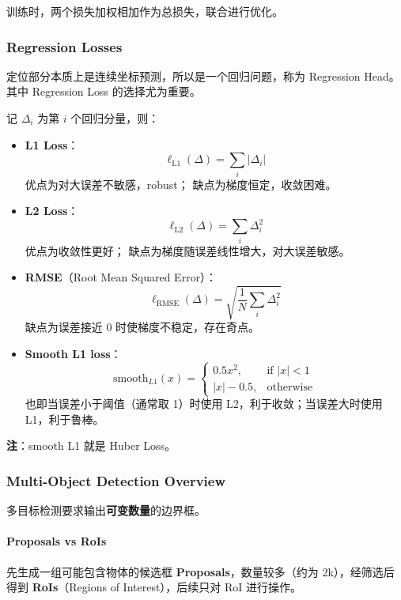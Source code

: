 训练时，两个损失加权相加作为总损失，联合进行优化。

\subsubsection{Regression Losses}\label{regression-losses}

定位部分本质上是连续坐标预测，所以是一个回归问题，称为 Regression
Head。其中 Regression Loss 的选择尤为重要。

记 \(\Delta_i\) 为第 \(i\) 个回归分量，则：

\begin{itemize}
\item
  \textbf{L1 Loss}： \[
    \ell_{\text{L1}}(\Delta) = \sum_i |\Delta_i|
    \] 优点为对大误差不敏感，robust； 缺点为梯度恒定，收敛困难。
\item
  \textbf{L2 Loss}： \[
    \ell_{\text{L2}}(\Delta) = \sum_i \Delta_i^2
    \] 优点为收敛性更好； 缺点为梯度随误差线性增大，对大误差敏感。
\item
  \textbf{RMSE}（Root Mean Squared Error）： \[
    \ell_{\text{RMSE}}(\Delta) = \sqrt{\frac{1}{N}\sum_i \Delta_i^2}
    \] 缺点为误差接近 0 时使梯度不稳定，存在奇点。
\item
  \textbf{Smooth L1 loss}： \[
    \text{smooth}_{L1}(x) =
    \begin{cases}
    0.5x^2, & \text{if } |x| < 1\\
    |x| - 0.5, & \text{otherwise}
    \end{cases}
    \] 也即当误差小于阈值（通常取 1）时使用 L2，利于收敛；当误差大时使用
  L1，利于鲁棒。
\end{itemize}

\textbf{注}：smooth L1 就是 Huber Loss。

\subsubsection{Multi-Object Detection
Overview}\label{multi-object-detection-overview}

多目标检测要求输出\textbf{可变数量}的边界框。

\paragraph{Proposals vs RoIs}\label{proposals-vs-rois}

先生成一组可能包含物体的候选框 \textbf{Proposals}，数量较多（约为
2k），经筛选后得到 \textbf{RoIs}（Regions of Interest），后续只对 RoI
进行操作。

